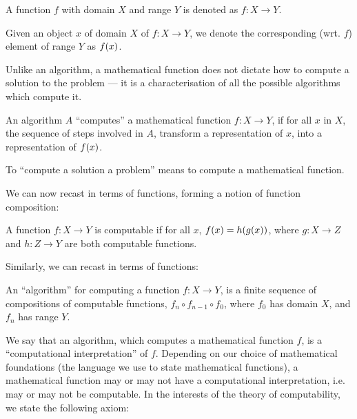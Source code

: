 \begin{notation} A function $f$ with domain $X$ and range $Y$ is denoted as
$f:X\rightarrow Y$. \end{notation}

\begin{notation} Given an object $x$ of domain $X$ of $f:X\rightarrow Y$, we
denote the corresponding (wrt. $f$) element of range $Y$ as $f\mathopen{}\left({x}\right)\mathclose{}$.
\end{notation}

Unlike an algorithm, a mathematical function does not dictate how to compute a
solution to the problem --- it is a characterisation of all the possible
algorithms which compute it.

\begin{notion}

An algorithm $A$ ``computes'' a mathematical function $f:X\rightarrow Y$, if
for all $x$ in $X$, the sequence of steps involved in $A$, transform a
representation of $x$, into a representation of $f\mathopen{}\left({x}\right)\mathclose{}$.

\end{notion}

\begin{notion} To ``compute a solution a problem'' means to compute a
mathematical function.  \end{notion}

We can now recast  in terms of functions,
forming a notion of function composition:

\begin{hypothesis} A function $f:X\rightarrow Y$ is computable if for all $x$,
$f\mathopen{}\left({x}\right)\mathclose{}=h\mathopen{}\left({g\mathopen{}\left({x}\right)\mathclose{}}\right)\mathclose{}$, where $g:X\rightarrow Z$ and $h:Z\rightarrow Y$ are both
computable functions. \end{hypothesis}

Similarly, we can recast  in terms of functions:

\begin{notion} An ``algorithm'' for computing a function $f:X\rightarrow Y$, is
a finite sequence of compositions of computable functions, $f_n \circ f_{n-1}
\circ f_0$, where $f_0$ has domain $X$, and $f_n$ has range $Y$. \end{notion}

We say that an algorithm, which computes a mathematical function $f$, is a
``computational interpretation'' of $f$. Depending on our choice of
mathematical foundations (the language we use to state mathematical functions),
a mathematical function may or may not have a computational interpretation,
i.e.  may or may not be computable. In the interests of the theory of
computability, we state the following axiom:

